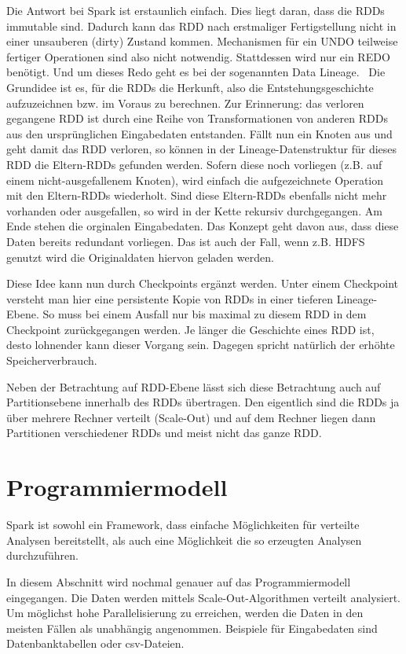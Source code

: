 Die Antwort bei Spark ist erstaunlich einfach. Dies liegt daran, dass
die RDDs immutable sind. Dadurch kann das RDD nach erstmaliger
Fertigstellung nicht in einer unsauberen (dirty) Zustand kommen.
Mechanismen für ein UNDO teilweise fertiger Operationen sind also nicht
notwendig. Stattdessen wird nur ein REDO benötigt. Und um dieses Redo
geht es bei der sogenannten Data Lineage. \ Die Grundidee ist es, für
die RDDs die Herkunft, also die Entstehungsgeschichte aufzuzeichnen
bzw. im Voraus zu berechnen. Zur Erinnerung: das verloren gegangene RDD
ist durch eine Reihe von Transformationen von anderen RDDs aus den
ursprünglichen Eingabedaten entstanden. Fällt nun ein Knoten aus und
geht damit das RDD verloren, so können in der Lineage-Datenstruktur für
dieses RDD die Eltern-RDDs gefunden werden. Sofern diese noch vorliegen
(z.B. auf einem nicht-ausgefallenem Knoten), wird einfach die
aufgezeichnete Operation mit den Eltern-RDDs wiederholt. Sind diese
Eltern-RDDs ebenfalls nicht mehr vorhanden oder ausgefallen, so wird in
der Kette rekursiv durchgegangen. Am Ende stehen die orginalen
Eingabedaten. Das Konzept geht davon aus, dass diese Daten bereits
redundant vorliegen. Das ist auch der Fall, wenn z.B. HDFS genutzt wird
die Originaldaten hiervon geladen werden.

Diese Idee kann nun durch Checkpoints ergänzt werden. Unter einem
Checkpoint versteht man hier eine persistente Kopie von RDDs in einer
tieferen Lineage-Ebene. So muss bei einem Ausfall nur bis maximal zu
diesem RDD in dem Checkpoint zurückgegangen werden. Je länger die
Geschichte eines RDD ist, desto lohnender kann dieser Vorgang sein.
Dagegen spricht natürlich der erhöhte Speicherverbrauch.

Neben der Betrachtung auf RDD-Ebene lässt sich diese Betrachtung auch
auf Partitionsebene innerhalb des RDDs übertragen. Den eigentlich sind
die RDDs ja über mehrere Rechner verteilt (Scale-Out) und auf dem
Rechner liegen dann Partitionen verschiedener RDDs und meist nicht das
ganze RDD.

\section[Programmiermodell]{\rmfamily
Programmiermodell}
Spark ist sowohl ein Framework, dass einfache Möglichkeiten für
verteilte Analysen bereitstellt, als auch eine Möglichkeit die so
erzeugten Analysen durchzuführen.

In diesem Abschnitt wird nochmal genauer auf das Programmiermodell
eingegangen. Die Daten werden mittels Scale-Out-Algorithmen verteilt
analysiert. Um möglichst hohe Parallelisierung zu erreichen, werden die
Daten in den meisten Fällen als unabhängig angenommen. Beispiele für
Eingabedaten sind Datenbanktabellen oder csv-Dateien.

